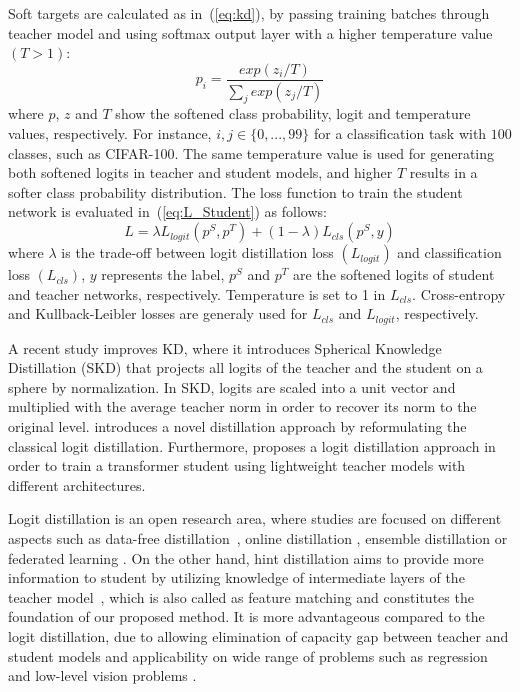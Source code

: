 \documentclass[final,3p,times]{elsarticle}
\begin{document}
Soft targets are calculated as in~(\ref{eq:kd}), by passing training batches through teacher model and using softmax output layer with a higher temperature value $(T>1)$:
\begin{equation}
\label{eq:kd}
    p_{i} = \frac{exp(z_i/T)}{\sum_{j}{exp(z_j/T)}}
\end{equation}
where $p$, $z$ and $T$ show the softened class probability, logit and temperature values, respectively. For instance,  $i,j \in \{0, ..., 99\}$ for a classification task with $100$ classes, such as CIFAR-100. The same temperature value is used for generating both softened logits in teacher and student models, and higher $T$ results in a softer class probability distribution. The loss function to train the student network is evaluated in~(\ref{eq:L_Student}) as follows:
\begin{equation}
\label{eq:L_Student}
    L = \lambda {L_{logit}}(p^S, p^T) + (1-\lambda)L_{cls}(p^S, y)
\end{equation}
where $\lambda$ is the trade-off between {logit} distillation loss {$(L_{logit})$} and classification loss $(L_{cls})$, $y$ represents the label, $p^S$ and $p^T$ are the softened logits of student and teacher networks, respectively. Temperature is set to 1 in $L_{cls}$. Cross-entropy and Kullback-Leibler losses are generaly used for $L_{cls}$ and {$L_{logit}$}, respectively.


A recent study \citep{guo2020spherical} improves KD, where it introduces Spherical Knowledge Distillation (SKD) that projects all logits of the teacher and the student on a sphere by normalization. In SKD, logits are scaled into a unit vector and multiplied with the average teacher norm in order to recover its norm to the original level. \citep{zhao2022decoupled} introduces a novel distillation approach by reformulating the classical logit distillation. Furthermore, \citep{ren2022co} proposes a logit distillation approach in order to train a transformer student using lightweight teacher models with different architectures.


Logit distillation is an open research area, where studies are focused on different aspects such as data-free distillation~\citep{kang2021data}, online distillation \citep{lan2018knowledge},
ensemble distillation \citep{nam2022improving}
or federated learning \citep{ni2022federated}. On the other hand, hint distillation aims to provide more information to student by utilizing knowledge of intermediate layers of the teacher model~\citep{romero2015fitnets,Zagoruyko2017AT,heo2019comprehensive, huang2022feature}, which is also called as feature matching and constitutes the foundation of our proposed method. It is more advantageous compared to the logit distillation, due to allowing elimination of capacity gap between teacher and student models and applicability on wide range of problems such as regression and low-level vision problems \citep{wang2021knowledge}.
\end{document}
